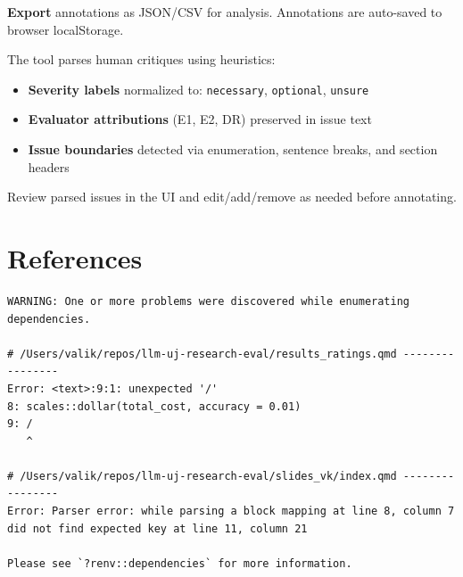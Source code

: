 \documentclass[
  11pt,
  letterpaper,
  DIV=11,
  numbers=noendperiod]{scrreprt}
\providecommand{\tightlist}{%
  \setlength{\itemsep}{0pt}\setlength{\parskip}{0pt}}
\begin{document}
\textbf{Export} annotations as JSON/CSV for analysis. Annotations are
auto-saved to browser localStorage.

\begin{tcolorbox}[enhanced jigsaw, colback=white, title=\textcolor{quarto-callout-note-color}{\faInfo}\hspace{0.5em}{Annotation Data Schema}, bottomrule=.15mm, coltitle=black, left=2mm, colframe=quarto-callout-note-color-frame, toptitle=1mm, toprule=.15mm, titlerule=0mm, breakable, leftrule=.75mm, colbacktitle=quarto-callout-note-color!10!white, bottomtitle=1mm, arc=.35mm, rightrule=.15mm, opacityback=0, opacitybacktitle=0.6]

The tool parses human critiques using heuristics:

\begin{itemize}
\tightlist
\item
  \textbf{Severity labels} normalized to: \texttt{necessary},
  \texttt{optional}, \texttt{unsure}
\item
  \textbf{Evaluator attributions} (E1, E2, DR) preserved in issue text
\item
  \textbf{Issue boundaries} detected via enumeration, sentence breaks,
  and section headers
\end{itemize}

Review parsed issues in the UI and edit/add/remove as needed before
annotating.

\end{tcolorbox}


\chapter*{References}\label{references}


\begin{verbatim}
WARNING: One or more problems were discovered while enumerating dependencies.

# /Users/valik/repos/llm-uj-research-eval/results_ratings.qmd ----------------
Error: <text>:9:1: unexpected '/'
8: scales::dollar(total_cost, accuracy = 0.01)
9: /
   ^

# /Users/valik/repos/llm-uj-research-eval/slides_vk/index.qmd ----------------
Error: Parser error: while parsing a block mapping at line 8, column 7 did not find expected key at line 11, column 21

Please see `?renv::dependencies` for more information.
\end{verbatim}
\end{document}
